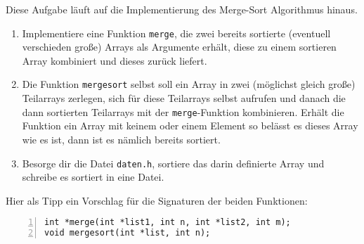 \documentclass{uebungszettel}
\begin{document}
\begin{aufg}
Diese Aufgabe läuft auf die Implementierung des Merge-Sort Algorithmus hinaus.
\begin{enumerate}
\item Implementiere eine Funktion \verb|merge|, die zwei bereits sortierte (eventuell verschieden große) Arrays als Argumente erhält, diese zu einem sortieren Array kombiniert und dieses zurück liefert. 
\item Die Funktion \verb|mergesort| selbst soll ein Array in zwei (möglichst gleich große) Teilarrays zerlegen, sich für diese Teilarrays selbst aufrufen und danach die dann sortierten Teilarrays mit der \verb|merge|-Funktion kombinieren. Erhält die Funktion ein Array mit keinem oder einem Element so belässt es dieses Array wie es ist, dann ist es nämlich bereits sortiert.
\item Besorge dir die Datei \verb|daten.h|, sortiere das darin definierte Array und schreibe es sortiert in eine Datei.
\end{enumerate}

Hier als Tipp ein Vorschlag für die Signaturen der beiden Funktionen:
\begin{codelisting}
\begin{lstlisting}[numbers=left,numberstyle=\tiny,frame=tlrb]
int *merge(int *list1, int n, int *list2, int m);
void mergesort(int *list, int n);
\end{lstlisting}
\end{codelisting}

\end{aufg}
\end{document}

